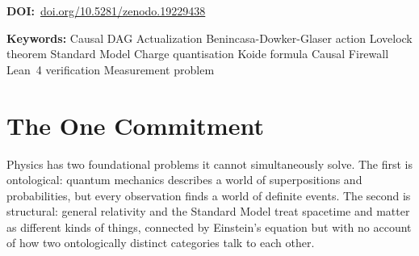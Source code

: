 \documentclass[11pt,a4paper]{article}
\begin{document}
\begin{titlepage}
\begin{abstract}
classification (five topology types mapping exactly to the Standard Model
particle spectrum); colour confinement ($L{=}3$ gluon, $L{=}4$ quark);
the BDG particle universe closure theorem (124 extension cases); structural
qubit fragility (electrons and photons at minimum BDG score~1); the
causal invariance of the quantum measure; Rindler stationarity (Unruh
resolution); and the $\mathcal{P}_{\mathrm{act}}$ conservation theorem
with BDG locality lemma --- together proving $G_{\mu\nu} = 8\pi G\,
\mathcal{P}_{\mathrm{act}}[T_{\mu\nu}]$ with $\Lambda = 0$ uniquely
from the Local Ledger Condition.
New results (April 2026): the wave-function actualization threshold
$\Delta S^* = -\log P_{\mathrm{acc}}(1) \approx 0.601$~nats is derived
from the BDG Poisson-CSG at $\mu = 1$, extending the four-scale to a
five-scale $\mu = 1$ unification; a spin-bath worked model yields the
parameter-free prediction $t^* \approx 0.274/g$; and a Lean theorem
$\to$ physics claim correspondence table (Table~2 of RAQM) maps seven
Lean-verified results to their physical claims.
RAQM has received an Accept with Minor Revisions recommendation from
\emph{Foundations of Physics} (April 2026).
\end{abstract}

\medskip\noindent
\textbf{DOI:}~\href{https://doi.org/10.5281/zenodo.19229438}{doi.org/10.5281/zenodo.19229438}

\medskip\noindent
\textbf{Keywords:} Causal DAG \textperiodcentered{} Actualization
\textperiodcentered{} Benincasa-Dowker-Glaser action \textperiodcentered{}
Lovelock theorem \textperiodcentered{} Standard Model \textperiodcentered{}
Charge quantisation \textperiodcentered{} Koide formula \textperiodcentered{}
Causal Firewall \textperiodcentered{} Lean~4 verification
\textperiodcentered{} Measurement problem

\end{titlepage}

\section{The One Commitment}
\label{sec:commitment}

Physics has two foundational problems it cannot simultaneously solve. The
first is ontological: quantum mechanics describes a world of superpositions and
probabilities, but every observation finds a world of definite events.
The second is structural: general relativity and the Standard Model treat
spacetime and matter as different kinds of things, connected by Einstein's
equation but with no account of how two ontologically distinct categories
talk to each other.
\end{document}
